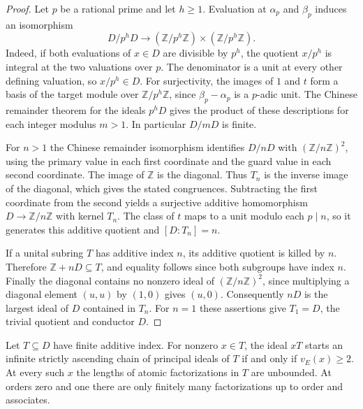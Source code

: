 \begin{proof}
    Let $p$ be a rational prime and let $h \ge 1$.
    Evaluation at $\alpha_p$ and $\beta_p$ induces an isomorphism
    \begin{equation}
        D/p^hD \longrightarrow
        (\mathbb{Z}/p^h\mathbb{Z}) \times (\mathbb{Z}/p^h\mathbb{Z}).
        \label{eq:two-residues}
    \end{equation}
    Indeed, if both evaluations of $x \in D$ are divisible by $p^h$, the quotient $x/p^h$ is integral at the two valuations over $p$.
    The denominator is a unit at every other defining valuation, so $x/p^h \in D$.
    For surjectivity, the images of $1$ and $t$ form a basis of the target module over $\mathbb{Z}/p^h\mathbb{Z}$, since $\beta_p - \alpha_p$ is a $p$-adic unit.
    The Chinese remainder theorem for the ideals $p^hD$ gives the product of these descriptions for each integer modulus $m > 1$.
    In particular $D/mD$ is finite.

    For $n > 1$ the Chinese remainder isomorphism identifies $D/nD$ with $(\mathbb{Z}/n\mathbb{Z})^2$, using the primary value in each first coordinate and the guard value in each second coordinate.
    The image of $\mathbb{Z}$ is the diagonal.
    Thus $T_n$ is the inverse image of the diagonal, which gives the stated congruences.
    Subtracting the first coordinate from the second yields a surjective additive homomorphism $D \to \mathbb{Z}/n\mathbb{Z}$ with kernel $T_n$.
    The class of $t$ maps to a unit modulo each $p \mid n$, so it generates this additive quotient and $[D:T_n] = n$.

    If a unital subring $T$ has additive index $n$, its additive quotient is killed by $n$.
    Therefore $\mathbb{Z} + nD \subseteq T$, and equality follows since both subgroups have index $n$.
    Finally the diagonal contains no nonzero ideal of $(\mathbb{Z}/n\mathbb{Z})^2$, since multiplying a diagonal element $(u, u)$ by $(1, 0)$ gives $(u, 0)$.
    Consequently $nD$ is the largest ideal of $D$ contained in $T_n$.
    For $n = 1$ these assertions give $T_1 = D$, the trivial quotient and conductor $D$.
\end{proof}

\begin{proposition}
    \label{prop:chain-height}
    Let $T \subseteq D$ have finite additive index.
    For nonzero $x \in T$, the ideal $xT$ starts an infinite strictly ascending chain of principal ideals of $T$ if and only if $v_E(x) \ge 2$.
    At every such $x$ the lengths of atomic factorizations in $T$ are unbounded.
    At orders zero and one there are only finitely many factorizations up to order and associates.
\end{proposition}


